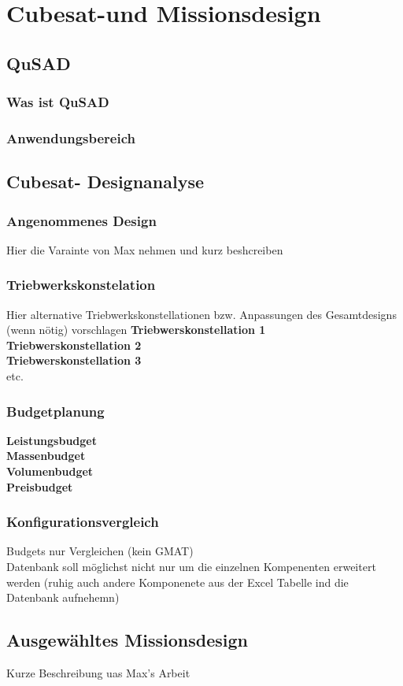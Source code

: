 \chapter{Cubesat-und Missionsdesign}
		\section{QuSAD}
				\subsection{Was ist QuSAD}
				\subsection{Anwendungsbereich}
		\section{Cubesat- Designanalyse}
				\subsection{Angenommenes Design}
						Hier die Varainte von Max nehmen und kurz beshcreiben
				\subsection{Triebwerkskonstelation}
				Hier alternative Triebwerkskonstellationen bzw. Anpassungen des Gesamtdesigns (wenn nötig) vorschlagen
								\textbf{Triebwerskonstellation 1}\\
								\textbf{Triebwerskonstellation 2}\\
								\textbf{Triebwerskonstellation 3}\\
								 etc.
				\subsection{Budgetplanung}
								\textbf{Leistungsbudget}\\
								\textbf{Massenbudget}\\
								\textbf{Volumenbudget}\\
								\textbf{Preisbudget}
		\subsection{Konfigurationsvergleich}
		Budgets nur Vergleichen (kein GMAT) \\
		Datenbank soll möglichst nicht nur um die einzelnen Kompenenten erweitert werden (ruhig auch andere Komponenete aus der Excel Tabelle ind die Datenbank aufnehemn)
		
		\section{	Ausgewähltes Missionsdesign}
		Kurze Beschreibung uas Max's Arbeit
				
